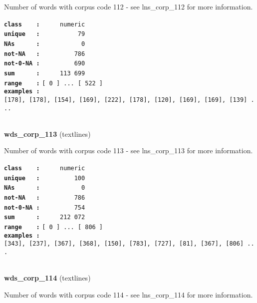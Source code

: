 \documentclass[]{article}
\begin{document}
Number of words with corpus code 112 - see lns\_corp\_112 for more
information.

\textbf{\texttt{class\ \ \ \ :}} \texttt{~~~~~numeric}\\
\textbf{\texttt{unique\ \ \ :}} \texttt{~~~~~~~~~~79}\\
\textbf{\texttt{NAs\ \ \ \ \ \ :}} \texttt{~~~~~~~~~~~0}\\
\textbf{\texttt{not-NA\ \ \ :}} \texttt{~~~~~~~~~786}\\
\textbf{\texttt{not-0-NA\ :}} \texttt{~~~~~~~~~690}\\
\textbf{\texttt{sum\ \ \ \ \ \ :}} \texttt{~~~~~113~699}\\
\textbf{\texttt{range\ \ \ \ :}}
\texttt{{[}\ 0\ {]}\ ...\ {[}\ 522\ {]}}\\
\textbf{\texttt{examples\ :}}
\texttt{{[}178{]},\ {[}178{]},\ {[}154{]},\ {[}169{]},\ {[}222{]},\ {[}178{]},\ {[}120{]},\ {[}169{]},\ {[}169{]},\ {[}139{]}\ ...}\\

~

\textbf{wds\_corp\_113} (textlines)

Number of words with corpus code 113 - see lns\_corp\_113 for more
information.

\textbf{\texttt{class\ \ \ \ :}} \texttt{~~~~~numeric}\\
\textbf{\texttt{unique\ \ \ :}} \texttt{~~~~~~~~~100}\\
\textbf{\texttt{NAs\ \ \ \ \ \ :}} \texttt{~~~~~~~~~~~0}\\
\textbf{\texttt{not-NA\ \ \ :}} \texttt{~~~~~~~~~786}\\
\textbf{\texttt{not-0-NA\ :}} \texttt{~~~~~~~~~754}\\
\textbf{\texttt{sum\ \ \ \ \ \ :}} \texttt{~~~~~212~072}\\
\textbf{\texttt{range\ \ \ \ :}}
\texttt{{[}\ 0\ {]}\ ...\ {[}\ 806\ {]}}\\
\textbf{\texttt{examples\ :}}
\texttt{{[}343{]},\ {[}237{]},\ {[}367{]},\ {[}368{]},\ {[}150{]},\ {[}783{]},\ {[}727{]},\ {[}81{]},\ {[}367{]},\ {[}806{]}\ ...}\\

~

\textbf{wds\_corp\_114} (textlines)

Number of words with corpus code 114 - see lns\_corp\_114 for more
information.
\end{document}

